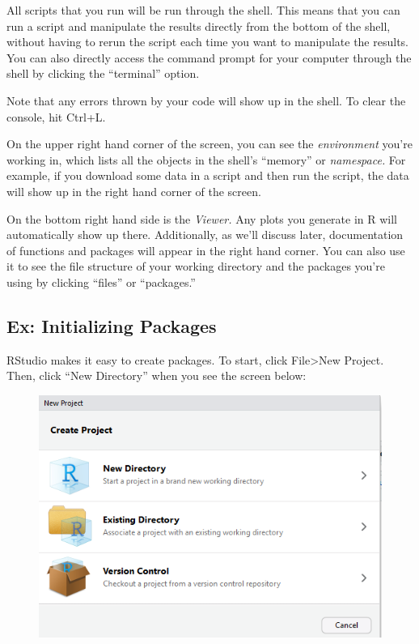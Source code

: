 \documentclass[]{book}
\begin{document}
All scripts that you run will be run through the shell. This means that
you can run a script and manipulate the results directly from the bottom
of the shell, without having to rerun the script each time you want to
manipulate the results. You can also directly access the command prompt
for your computer through the shell by clicking the ``terminal'' option.

Note that any errors thrown by your code will show up in the shell. To
clear the console, hit Ctrl+L.

On the upper right hand corner of the screen, you can see the
\emph{environment} you're working in, which lists all the objects in the
shell's ``memory'' or \emph{namespace.} For example, if you download
some data in a script and then run the script, the data will show up in
the right hand corner of the screen.

On the bottom right hand side is the \emph{Viewer.} Any plots you
generate in R will automatically show up there. Additionally, as we'll
discuss later, documentation of functions and packages will appear in
the right hand corner. You can also use it to see the file structure of
your working directory and the packages you're using by clicking
``files'' or ``packages.''

\subsection{Ex: Initializing Packages}\label{ex-initializing-packages}

RStudio makes it easy to create packages. To start, click
File\textgreater{}New Project. Then, click ``New Directory'' when you
see the screen below:

\begin{figure}
\centering
\includegraphics{images/packageSS/createproj1.PNG}
\caption{}
\end{figure}
\end{document}
